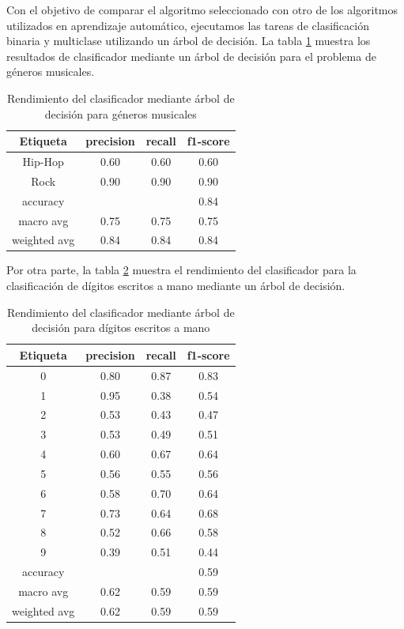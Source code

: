 \documentclass[runningheads]{llncs}
\begin{document}
Con el objetivo de comparar el algoritmo seleccionado con otro de los algoritmos utilizados en aprendizaje automático, ejecutamos las tareas de clasificación binaria y multiclase utilizando un árbol de decisión. La tabla \ref{tab:musicClass} muestra los resultados de clasificador mediante un árbol de decisión para el problema de géneros musicales.

\begin{table}[h]
    \centering
    \begin{tabular}{|c|c|c|c|}
    \hline
    Etiqueta & precision  &  recall & f1-score\\
    \hline
    Hip-Hop &  0.60 & 0.60 & 0.60\\
    Rock &  0.90 & 0.90 & 0.90\\
    \hline
    accuracy & &  & 0.84 \\
    macro avg &  0.75 & 0.75 & 0.75\\
    weighted avg &  0.84 & 0.84 & 0.84\\
    \hline
    \end{tabular}
    \caption{Rendimiento del clasificador mediante árbol de decisión para géneros musicales}
    \label{tab:musicClass}
\end{table}

Por otra parte, la tabla \ref{tab:Digitos} muestra el rendimiento del clasificador para la clasificación de dígitos escritos a mano mediante un árbol de decisión.

\begin{table}[h]
    \centering
    \begin{tabular}{|c|c|c|c|}
    \hline
    Etiqueta & precision & recall & f1-score\\
\hline
0 &  0.80 & 0.87 & 0.83\\
1 &  0.95 & 0.38 & 0.54\\
2 &  0.53 & 0.43 & 0.47\\
3 &  0.53 & 0.49 & 0.51\\
4 &  0.60 & 0.67 & 0.64\\
5 &  0.56 & 0.55 & 0.56\\
6 &  0.58 & 0.70 & 0.64\\
7 &  0.73 & 0.64 & 0.68\\
8 &  0.52 & 0.66 & 0.58\\
9 &  0.39 & 0.51 & 0.44\\
\hline
accuracy & &  & 0.59\\
macro avg &  0.62 & 0.59 & 0.59\\
weighted avg &  0.62 & 0.59 & 0.59\\
\hline
    \end{tabular}
    \caption{Rendimiento del clasificador mediante árbol de decisión para dígitos escritos a mano}
    \label{tab:Digitos}
\end{table}
\end{document}
